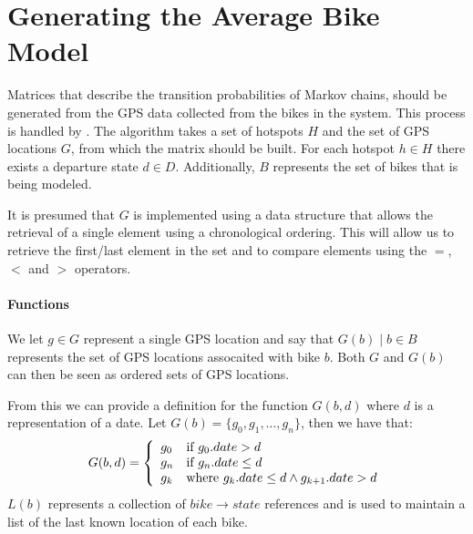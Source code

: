 \section{Generating the Average Bike Model} \label{markov:create_model}
Matrices that describe the transition probabilities of Markov chains, should be generated from the GPS data collected from the bikes in the system.
This process is handled by .
The algorithm takes a set of hotspots $H$ and the set of GPS locations $G$, from which the matrix should be built.
For each hotspot $h \in H$ there exists a departure state $d \in D$.
Additionally, $B$ represents the set of bikes that is being modeled.

It is presumed that $G$ is implemented using a data structure that allows the retrieval of a single element using a chronological ordering.
This will allow us to retrieve the first/last element in the set and to compare elements using the $=$, $<$ and $>$ operators.

\paragraph{Functions}
We let $g \in G$ represent a single GPS location and say that $G(b) \mid b \in B$ represents the set of GPS locations assocaited with bike $b$.
Both $G$ and $G(b)$ can then be seen as ordered sets of GPS locations.

From this we can provide a definition for the function $G(b, d)$ where $d$ is a representation of a date.
Let $G(b) = \{g_0, g_1, \dots, g_n\}$, then we have that:
\begin{equation}
G(b, d) = 
\left\{
  \begin{array}{l l}
    g_0 & \text{if $g_0.date > d$}\\
    g_n & \text{if $g_n.date \leq d$}\\
    g_k & \text{where $g_k.date \leq d \wedge g_{k+1}.date > d$}
  \end{array} \right.
\end{equation}
$L(b)$ represents a collection of $bike \rightarrow state$ references and is used to maintain a list of the last known location of each bike.

